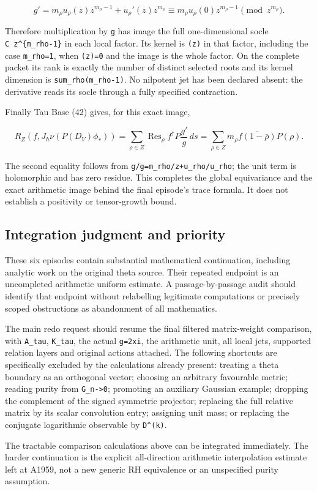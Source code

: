 \[
g'=m_\rho u_\rho(z)z^{m_\rho-1}+u_\rho'(z)z^{m_\rho}
\equiv m_\rho u_\rho(0)z^{m_\rho-1}\pmod{z^{m_\rho}}.
\]

Therefore multiplication by \texttt{g\textquotesingle{}} has image the
full one-dimensional socle \texttt{C\ z\^{}\{m\_rho-1\}} in each local
factor. Its kernel is \texttt{(z)} in that factor, including the case
\texttt{m\_rho=1}, when \texttt{(z)=0} and the image is the whole
factor. On the complete packet its rank is exactly the number of
distinct selected roots and its kernel dimension is
\texttt{sum\_rho(m\_rho-1)}. No nilpotent jet has been declared absent:
the derivative reads its socle through a fully specified contraction.

Finally Tau Base (42) gives, for this exact image,

\[
R_Z(f,J_h\nu(P(D_V)\phi_*))
=\sum_{\rho\in Z}\operatorname{Res}_\rho f^\dagger P\frac{g'}g\,ds
=\sum_{\rho\in Z}m_\rho\overline{f(1-\bar\rho)}P(\rho).
\]

The second equality follows from
\texttt{g\textquotesingle{}/g=m\_rho/z+u\_rho\textquotesingle{}/u\_rho};
the unit term is holomorphic and has zero residue. This completes the
global equivariance and the exact arithmetic image behind the final
episode's trace formula. It does not establish a positivity or
tensor-growth bound.

\subsection{Integration judgment and
priority}\label{integration-judgment-and-priority}

These six episodes contain substantial mathematical continuation,
including analytic work on the original theta source. Their repeated
endpoint is an uncompleted arithmetic uniform estimate. A
passage-by-passage audit should identify that endpoint without
relabelling legitimate computations or precisely scoped obstructions as
abandonment of all mathematics.

The main redo request should resume the final filtered matrix-weight
comparison, with \texttt{A\_tau}, \texttt{K\_tau}, the actual
\texttt{g=2xi}, the arithmetic unit, all local jets, supported relation
layers and original actions attached. The following shortcuts are
specifically excluded by the calculations already present: treating a
theta boundary as an orthogonal vector; choosing an arbitrary favourable
metric; reading purity from \texttt{G\_n-\textgreater{}0}; promoting an
auxiliary Gaussian example; dropping the complement of the signed
symmetric projector; replacing the full relative matrix by its scalar
convolution entry; assigning unit mass; or replacing the conjugate
logarithmic observable by \texttt{D\^{}(k)}.

The tractable comparison calculations above can be integrated
immediately. The harder continuation is the explicit all-direction
arithmetic interpolation estimate left at A1959, not a new generic RH
equivalence or an unspecified purity assumption.
